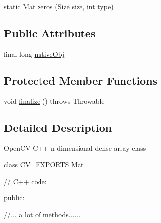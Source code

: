 \begin{DoxyCompactItemize}
\item 
static \mbox{\hyperlink{classorg_1_1opencv_1_1core_1_1_mat}{Mat}} \mbox{\hyperlink{classorg_1_1opencv_1_1core_1_1_mat_ae346269a0f9ee375ffe987e8d8031014}{zeros}} (\mbox{\hyperlink{classorg_1_1opencv_1_1core_1_1_size}{Size}} \mbox{\hyperlink{classorg_1_1opencv_1_1core_1_1_mat_a543d6f8a103a5f3d899030d76286f0cf}{size}}, int \mbox{\hyperlink{classorg_1_1opencv_1_1core_1_1_mat_a555bc7243135e2883afe54e7e5e92c79}{type}})
\end{DoxyCompactItemize}
\subsection*{Public Attributes}
\begin{DoxyCompactItemize}
\item 
final long \mbox{\hyperlink{classorg_1_1opencv_1_1core_1_1_mat_a497713e25ec636f1185e08d7692d065b}{native\+Obj}}
\end{DoxyCompactItemize}
\subsection*{Protected Member Functions}
\begin{DoxyCompactItemize}
\item 
void \mbox{\hyperlink{classorg_1_1opencv_1_1core_1_1_mat_aca52fe6f5554bfbff11c44e07952ba2d}{finalize}} ()  throws Throwable 
\end{DoxyCompactItemize}


\subsection{Detailed Description}
Open\+CV C++ n-\/dimensional dense array class

class C\+V\+\_\+\+E\+X\+P\+O\+R\+TS \mbox{\hyperlink{classorg_1_1opencv_1_1core_1_1_mat}{Mat}} {\ttfamily }

{\ttfamily }

{\ttfamily }

{\ttfamily // C++ code\+:}

{\ttfamily }

{\ttfamily }

{\ttfamily public\+:}

{\ttfamily }

{\ttfamily }

{\ttfamily //... a lot of methods......}

{\ttfamily }

{\ttfamily }

